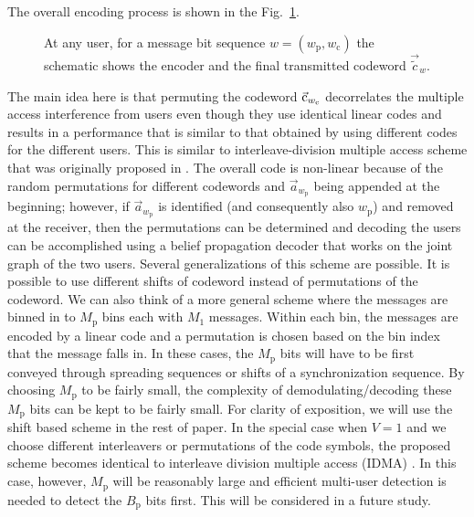 The overall encoding process is shown in the Fig.~\ref{fig:encodingscheme}.
\begin{figure}[h!]
  \centering
  \resizebox{0.55\textwidth}{!}{}
  \caption{At any user, for a message bit sequence  $w=(w_\mathrm{p},w_\mathrm{c})$ the schematic shows the encoder and the final transmitted codeword $\vec{\tilde{c}}_w$.}
  \label{fig:encodingscheme}
\end{figure}
The main idea here is that permuting the codeword $\vec{\mathrm{c}}_{w_\mathrm{c}}$ decorrelates the multiple access interference from users even though they use identical linear codes and results in a performance that is similar to that obtained by using different codes for the different users. This is similar to interleave-division multiple access scheme that was originally proposed in \cite{ping2006interleave}. The overall code is non-linear because of the random permutations for different codewords and $\vec{a}_{w_\mathrm{p}}$ being appended at the beginning; however, if $\vec{a}_{w_\mathrm{p}}$ is identified (and consequently also $w_\mathrm{p}$) and removed at the receiver, then the permutations can be determined and decoding the users  can be accomplished using a belief propagation decoder that works on the joint graph of the two users.
\iflonger
Several generalizations of this scheme are possible. It is possible to use different shifts of codeword instead of permutations of the codeword. We can also think of a more general scheme where the messages are binned in to $M_\mathrm{p}$ bins each with $M_1$ messages. Within each bin, the messages are encoded by a linear code and a permutation is chosen based on the bin index that the message falls in. In these cases, the $M_\mathrm{p}$ bits will have to be first conveyed through spreading sequences or shifts of a synchronization sequence. By choosing $M_\mathrm{p}$ to be fairly small, the complexity of demodulating/decoding these $M_\mathrm{p}$ bits can be kept to be fairly small. For clarity of exposition, we will use the shift based scheme in the rest of paper. In the special case when $V=1$ and we choose different interleavers or permutations of the code symbols, the proposed scheme becomes identical to interleave division multiple access (IDMA) \cite{ping2006interleave}. In this case, however, $M_\mathrm{p}$ will be reasonably large and efficient multi-user detection is needed to detect the $B_\mathrm{p}$ bits first. This will be considered in a future study.
\fi

